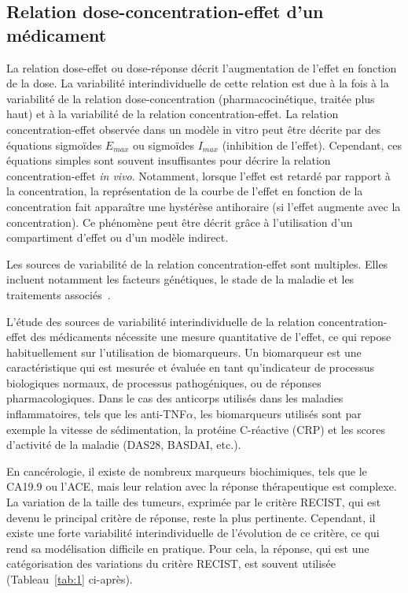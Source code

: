 \subsection{Relation dose-concentration-effet d'un médicament}
La relation dose-effet ou dose-réponse décrit l'augmentation de l'effet en fonction de la dose. La variabilité interindividuelle de cette relation est due à la fois à la variabilité de la relation dose-concentration (pharmacocinétique, traitée plus haut) et à la variabilité de la relation concentration-effet. La relation concentration-effet observée dans un modèle in vitro peut être décrite par des équations sigmoïdes $E_{max}$ ou sigmoïdes $I_{max}$ (inhibition de l'effet). Cependant, ces équations simples sont souvent insuffisantes pour décrire la relation concentration-effet \textit{in vivo}. Notamment, lorsque l'effet est retardé par rapport à la concentration, la représentation de la courbe de l'effet en fonction de la concentration fait apparaître une hystérèse antihoraire (si l'effet augmente avec la concentration). Ce phénomène peut être décrit grâce à l'utilisation d'un compartiment d'effet ou d'un modèle indirect.

Les sources de variabilité de la relation concentration-effet sont multiples. Elles incluent notamment les facteurs génétiques, le stade de la maladie et les traitements associés~\citep{REF7}.

L'étude des sources de variabilité interindividuelle de la relation concentration-effet des médicaments nécessite une mesure quantitative de l'effet, ce qui repose habituellement sur l'utilisation de biomarqueurs. Un biomarqueur est une caractéristique qui est mesurée et évaluée en tant qu'indicateur de processus biologiques normaux, de processus pathogéniques, ou de réponses pharmacologiques. Dans le cas des anticorps utilisés dans les maladies inflammatoires, tels que les anti-TNF$\alpha$, les biomarqueurs utilisés sont par exemple la vitesse de sédimentation, la protéine C-réactive (\gls{CRP}) et les scores d'activité de la maladie (DAS28, BASDAI, etc.).

En cancérologie, il existe de nombreux marqueurs biochimiques, tels que le CA19.9 ou l'ACE, mais leur relation avec la réponse thérapeutique est complexe. La variation de la taille des tumeurs, exprimée par le critère RECIST, qui est devenu le principal critère de réponse, reste la plus pertinente. Cependant, il existe une forte variabilité interindividuelle de l'évolution de ce critère, ce qui rend sa modélisation difficile en pratique. Pour cela, la réponse, qui est une catégorisation des variations du critère RECIST, est souvent utilisée  (Tableau~\ref{tab:1} ci-après). 

